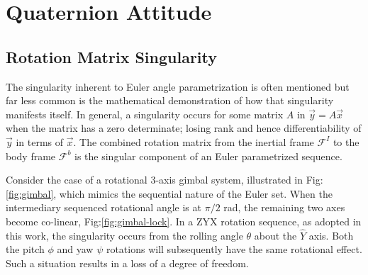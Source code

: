 \section{Quaternion Attitude}
\subsection{Rotation Matrix Singularity}\label{subsec:dynamics.rigidbody.singularity}
The singularity inherent to Euler angle parametrization is often mentioned but far less common is the mathematical demonstration of how that singularity manifests itself.  In general, a singularity occurs for some matrix $A$ in $\vec{y}=A\vec{x}$ when the matrix has a zero determinate; losing rank and hence differentiability of $\vec{y}$ in terms of $\vec{x}$. The combined rotation matrix from the inertial frame $\mathcal{F}^{I}$ to the body frame $\mathcal{F}^{b}$ is the singular component of an Euler parametrized sequence. 
\par
Consider the case of a rotational 3-axis gimbal system, illustrated in Fig:\ref{fig:gimbal}, which mimics the sequential nature of the Euler set. When the intermediary sequenced rotational angle is at $\pi/2$ rad, the remaining two axes become co-linear, Fig:\ref{fig:gimbal-lock}. In a ZYX rotation sequence, as adopted in this work, the singularity occurs from the rolling angle $\theta$ about the $\hat{Y}$ axis. Both the pitch $\phi$ and yaw $\psi$ rotations will subsequently have the same rotational effect. Such a situation results in a loss of a degree of freedom.
\newpage
